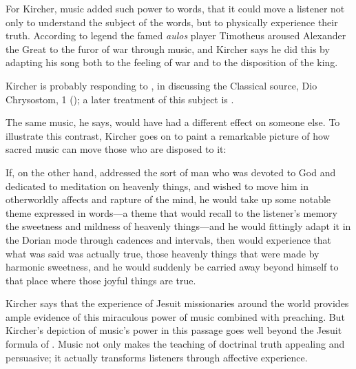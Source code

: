For Kircher, music added such power to words, that it could move a listener not
only to understand the subject of the words, but to physically experience their
truth.
According to legend the famed \emph{aulos} player Timotheus aroused Alexander
the Great to the furor of war through music, and Kircher says he did this by
adapting his song both to the feeling of war and to the disposition of the
king.%
\begin{Footnote}
    Kircher is probably responding to \autocite[90]{Galilei:Dialogo}, in
    discussing the Classical source, Dio Chrysostom,  1
    (); a later treatment of this subject is
    \autocite{Dryden:Alexander}.
\end{Footnote}
The same music, he says, would have had a different effect on someone else.
To illustrate this contrast, Kircher goes on to paint a remarkable picture of
how sacred music can move those who are disposed to it:
\begin{quoting}
    If, on the other hand,  addressed the sort of man who was
    devoted to God and dedicated to meditation on heavenly things, and wished to
    move him in otherworldly affects and rapture of the mind, he would take up
    some notable theme expressed in words---a theme that would recall to the
    listener's memory the sweetness and mildness of heavenly things---and he
    would fittingly adapt it in the Dorian mode through cadences and intervals,
    then  would experience that what was said was actually
    true, those heavenly things that were made by harmonic sweetness, and he
    would suddenly be carried away beyond himself to that place where those
    joyful things are true.%
        \Autocite[, : .] 
        {Kircher:Musurgia}
\end{quoting}
Kircher says that the experience of Jesuit missionaries around the world
provides ample evidence of this miraculous power of music combined with
preaching.
But Kircher's depiction of music's power in this passage goes well beyond the
Jesuit formula of .%
    \Autocite
    [On the Jesuit approach to religious arts, see] [35--51]
    {Bailey:Art}
Music not only makes the teaching of doctrinal truth appealing and persuasive;
it actually transforms listeners through affective experience.

